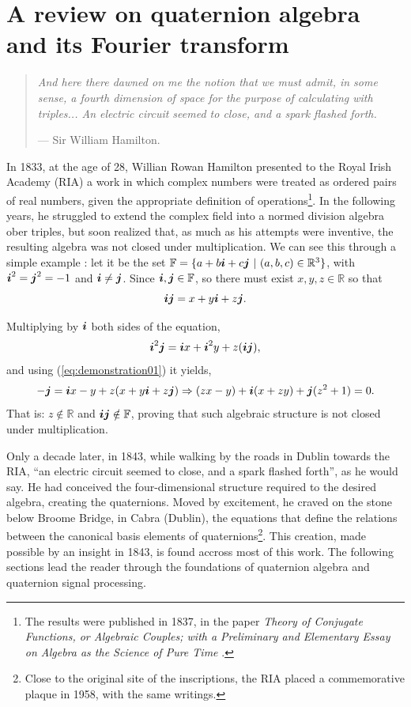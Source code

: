 \chapter{A review on quaternion algebra and its Fourier transform}
\label{ch:reviewQuat}

\begin{quotation}
\itshape
And here there dawned on me the notion that we must admit, in some sense, a fourth dimension of space for the purpose of calculating with triples... An electric circuit seemed to close, and a spark flashed forth.

\noindent --- Sir William Hamilton.
\end{quotation}


In 1833, at the age of 28, Willian Rowan Hamilton presented to the Royal Irish Academy (RIA) a work in which complex numbers were treated as ordered pairs of real numbers, given the appropriate definition of operations\footnote{The results were published in 1837, in the paper \emph{Theory of Conjugate Functions, or Algebraic Couples; with a Preliminary and Elementary Essay on Algebra as the Science of Pure Time} \cite{hamilton1837theory}.}. In the following years, he struggled to extend the complex field into a normed division algebra ober triples, but soon realized that, as much as his attempts were inventive, the resulting algebra was not closed under multiplication. We can see this through a simple example \cite{santos2011algebra}: let it be the set $\mathbb{F} = \{ a + b \boldsymbol{i} + c \boldsymbol{j}  \ | \ (a, b, c) \in \mathbb{R}^3\}$, with $\boldsymbol{i}^2 = \boldsymbol{j}^2 = -1$ and $\boldsymbol{i} \neq \boldsymbol{j}$. Since $\boldsymbol{i}, \boldsymbol{j} \in \mathbb{F}$, so there must exist $x, y, z \in \mathbb{R}$ so that
\begin{equation}
\boldsymbol{i} \boldsymbol{j} = x + y \boldsymbol{i} + z \boldsymbol{j}.
\label{eq:demonstration01}
\end{equation}

Multiplying by $\boldsymbol{i}$ both sides of the equation,
\begin{equation}
\boldsymbol{i}^2 \boldsymbol{j} = \boldsymbol{i} x + \boldsymbol{i}^2 y + z (\boldsymbol{i} \boldsymbol{j}),
\end{equation}
and using (\ref{eq:demonstration01}) it yields,
\begin{equation}
- \boldsymbol{j} = \boldsymbol{i} x - y + z (x + y \boldsymbol{i} + z \boldsymbol{j})
\Rightarrow
(zx - y) + \boldsymbol{i} (x + zy) + \boldsymbol{j} (z^2 + 1) = 0.
\end{equation}
That is: $z \notin \mathbb{R}$ and $ \boldsymbol{i} \boldsymbol{j} \notin \mathbb{F} $, proving that such algebraic structure is not closed under multiplication.

Only a decade later, in 1843, while walking by the roads in Dublin towards the RIA, ``an electric circuit seemed to close, and a spark flashed forth'', as he would say. He had conceived the four-dimensional structure required to the desired algebra, creating the quaternions. Moved by excitement, he craved on the stone below Broome Bridge, in Cabra (Dublin), the equations that define the relations between the canonical basis elements of quaternions\footnote{Close to the original site of the inscriptions, the RIA placed a commemorative plaque in 1958, with the same writings.}. This creation, made possible by an insight in 1843, is found accross most of this work. The following sections lead the reader through the foundations of quaternion algebra and quaternion signal processing.


